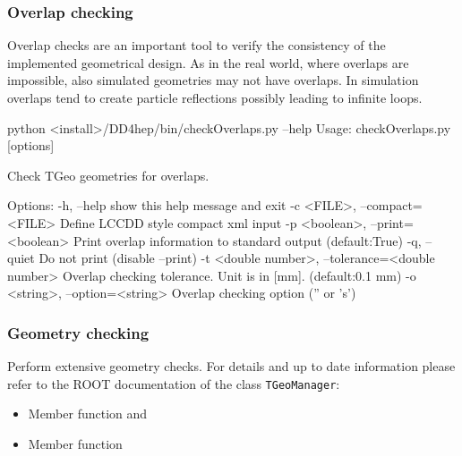 \documentclass[10pt,a4paper]{article}
\begin{document}
\subsubsection{Overlap checking}
\label{sec:dd4hep-manual-overlap-checking}
\noindent
Overlap checks are an important tool to verify the consistency of the 
implemented geometrical design. As in the real world, where overlaps are 
impossible, also simulated geometries may not have overlaps. In simulation
overlaps tend to create particle reflections possibly leading to infinite
loops.
\begin{code}
    python <install>/DD4hep/bin/checkOverlaps.py --help
    Usage: checkOverlaps.py [options]

    Check TGeo geometries for overlaps.

    Options:
      -h, --help                        show this help message and exit
      -c <FILE>, --compact=<FILE>       Define LCCDD style compact xml input
      -p <boolean>, --print=<boolean>   Print overlap information to standard output
                                        (default:True)
      -q, --quiet                       Do not print (disable --print)
      -t <double number>, --tolerance=<double number>
                                        Overlap checking tolerance. Unit is in [mm].
                                        (default:0.1 mm)
      -o <string>, --option=<string>    Overlap checking option ('' or 's')
\end{code}

\subsubsection{Geometry checking}
\label{sec:dd4hep-manual-geometry-checking}
\noindent
Perform extensive geometry checks. For details and up to date information 
please refer to the ROOT documentation of the class {\tt{TGeoManager}}:
\begin{itemize}\itemcompact
\item Member function {} and 
\item Member function {}
\end{itemize}
\end{document}
